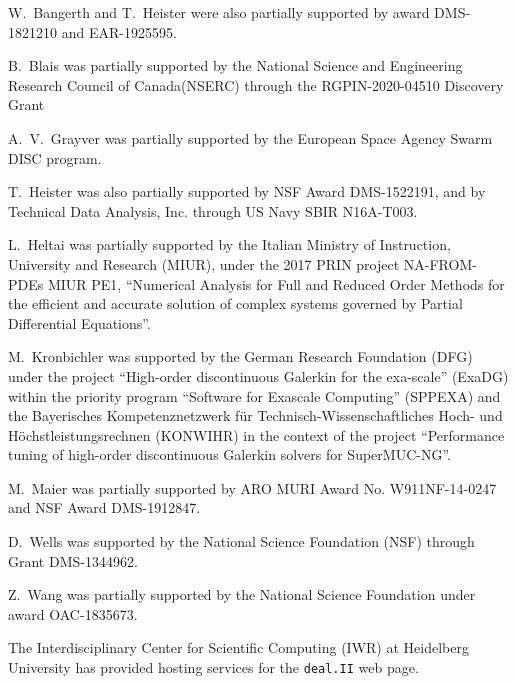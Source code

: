 \documentclass{ansarticle-preprint}
\newcommand{\specialword}[1]{\texttt{#1}}
\newcommand{\dealii}{{\specialword{deal.II}}\xspace}
\begin{document}
W.~Bangerth and T.~Heister were also partially supported by award DMS-1821210
and EAR-1925595.


B.~Blais was partially supported by the National Science and Engineering Research Council of Canada(NSERC)  through the RGPIN-2020-04510 Discovery Grant

A.~V.~Grayver was partially supported by the European Space Agency
Swarm DISC program.

T.~Heister was also partially supported by NSF Award DMS-1522191, and
by Technical Data Analysis, Inc. through US Navy SBIR N16A-T003.

L.~Heltai was partially supported by the Italian Ministry of Instruction,
University and Research (MIUR), under the 2017 PRIN project NA-FROM-PDEs MIUR
PE1, ``Numerical Analysis for Full and Reduced Order Methods for the efficient
and accurate solution of complex systems governed by Partial Differential
Equations''.

M.~Kronbichler was supported by the German
Research Foundation (DFG) under the project ``High-order discontinuous
Galerkin for the exa-scale'' (\mbox{ExaDG}) within the priority program ``Software
for Exascale Computing'' (SPPEXA) and the Bayerisches Kompetenznetzwerk
f\"ur Technisch-Wissen\-schaft\-li\-ches Hoch- und H\"ochstleistungsrechnen
(KONWIHR) in the context of the project
``Performance tuning of high-order discontinuous Galerkin solvers for
SuperMUC-NG''.

M.~Maier was partially supported by ARO MURI Award No. W911NF-14-0247 and
NSF Award DMS-1912847.

D.~Wells was supported by the National Science Foundation (NSF) through Grant
DMS-1344962.

Z.~Wang was partially
supported by the National Science Foundation under award OAC-1835673.

The Interdisciplinary Center for Scientific Computing (IWR) at Heidelberg
University has provided hosting services for the \dealii{} web page.


{}

\end{document}
